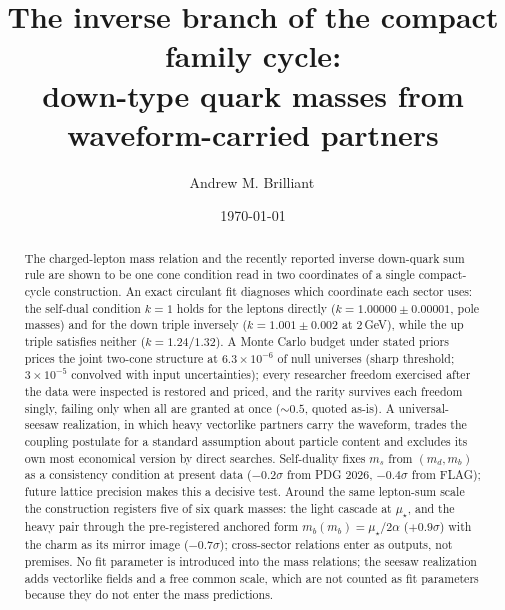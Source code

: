 \documentclass[11pt]{article}
\begin{document}
\title{The inverse branch of the compact family cycle:\\ down-type quark masses from waveform-carried partners}

\author{Andrew M. Brilliant\,}


\date{\today}

\maketitle

\begin{abstract}
The charged-lepton mass relation and the recently reported inverse down-quark
sum rule are shown to be one cone condition read in two coordinates of a single
compact-cycle construction. An exact circulant fit diagnoses which coordinate
each sector uses: the self-dual condition $k=1$ holds for the leptons directly
($k=1.00000\pm0.00001$, pole masses) and for the down triple inversely
($k=1.001\pm0.002$ at $2$\,GeV), while the up triple satisfies neither
($k=1.24$/$1.32$). A Monte Carlo budget under stated priors prices the joint
two-cone structure at $6.3\times10^{-6}$ of null universes (sharp threshold;
$3\times10^{-5}$ convolved with input uncertainties); every researcher freedom
exercised after the data were inspected is restored and priced, and the rarity
survives each freedom singly, failing only when all are granted at once
($\sim0.5$, quoted as-is). A universal-seesaw realization, in which heavy
vectorlike partners carry the waveform, trades the coupling postulate for a
standard assumption about particle content and excludes its own most economical
version by direct searches. Self-duality fixes $m_s$ from $(m_d, m_b)$ as a
consistency condition at present data ($-0.2\sigma$ from PDG 2026,
$-0.4\sigma$ from FLAG); future lattice precision makes this a decisive test.
Around the same lepton-sum scale the construction registers five of six quark
masses: the light cascade at $\mu_\star$, and the heavy pair through the
pre-registered anchored form $m_b(m_b) = \mu_\star/2\alpha$ ($+0.9\sigma$) with
the charm as its mirror image ($-0.7\sigma$); cross-sector relations enter as
outputs, not premises. No fit parameter is introduced into the mass relations;
the seesaw realization adds vectorlike fields and a free common scale, which
are not counted as fit parameters because they do not enter the mass
predictions.
\end{abstract}
\end{document}
